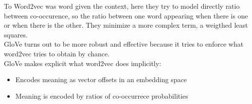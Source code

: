 To Word2vec was word given the context, here they try to model directly ratio between co-occurence, so the ratio between one word appearing when there is one or when there is the other. They minimize a more complex term,
a weigthed least squares. \\
GloVe turns out to be more robust and effective because it tries to enforce what word2vec tries to obtain by chance. \\
GloVe makes explicit what word2vec does implicitly:
\begin{itemize}
    \item Encodes meaning as vector offsets in an embedding space
    \item Meaning is encoded by ratios of co-occurrece probabilities
\end{itemize}{}